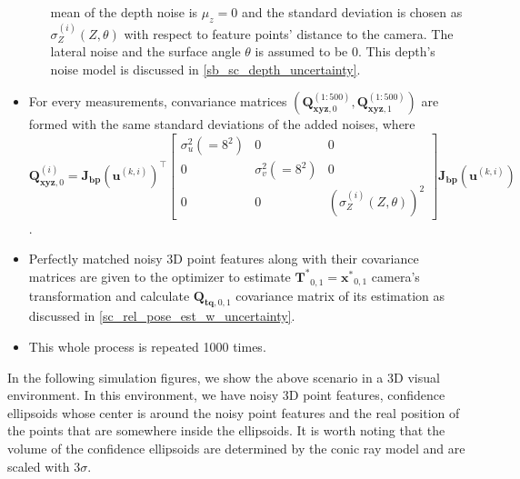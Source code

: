 \documentclass[a4paper]{report}
\numberwithin{figure}{section}
\begin{document}
\begin{itemize}
\begin{itemize}
            mean of the depth noise is $\mu_z=0$ and the standard deviation is 
            chosen 
            as $\sigma_Z^{(i)} (Z,\theta)$ 
            with respect to feature points' distance to the camera.
            The lateral noise and the surface angle $\theta$ is assumed to be 0.
            This depth's noise model is discussed in \ref{sb_sc_depth_uncertainty}.
        \end{itemize}
    \item For every measurements, convariance matrices 
      $(\mathbf{Q}_{\mathbf{xyz},0}^{(1:500)}, \mathbf{Q}_{\mathbf{xyz},1}^{(1:500)})$ are formed with 
      the same standard deviations of the added noises, where  
    $\mathbf{Q}_{\mathbf{xyz},0}^{(i)} = 
    \mathbf{J_{bp}}(\mathbf{u}^{(k,i)})^\top
  \begin{bmatrix} 
    \sigma_u^2(=8^2) & 0 & 0 \\ 
    0 & \sigma_v^2(=8^2) & 0 \\
    0 & 0 & (\sigma_Z^{(i)}(Z, \theta))^2
  \end{bmatrix} \mathbf{J_{bp}}(\mathbf{u}^{(k,i)})$.

    \item Perfectly matched noisy 3D point features along with their covariance matrices 
      are given to the optimizer 
      to estimate $\mathbf{T^*}_{0,1}=\mathbf{x^*}_{0,1}$ camera's transformation 
      and calculate $\mathbf{Q}_{\mathbf{tq},0,1}$ covariance matrix of its estimation 
      as discussed in \ref{sc_rel_pose_est_w_uncertainty}.
    \item This whole process is repeated 1000 times.
\end{itemize}

In the following simulation figures, we show 
the above scenario in a 3D visual environment. 
In this environment, we have  
noisy 3D point features, confidence ellipsoids whose center is around the 
noisy point features and the real position of the points that are somewhere 
inside the ellipsoids.
It is worth noting that the volume of the confidence ellipsoids are 
determined by the conic ray model and are scaled with $3\sigma$.
\end{document}
